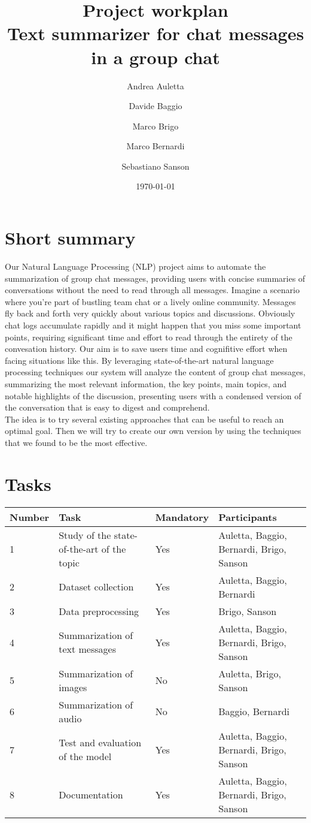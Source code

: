 \documentclass[12pt]{article}
\title{\textbf{Project workplan} \\ 
    \large Text summarizer for chat messages in a group chat}
\author{
    Andrea Auletta
    \and
    Davide Baggio
    \and
    Marco Brigo
    \and
    Marco Bernardi
    \and
    Sebastiano Sanson
}
\date{\today}
\begin{document}
\maketitle
\newpage
\tableofcontents
\newpage


\section{Short summary}
Our Natural Language Processing (NLP) project aims to automate the summarization of group 
chat messages, providing users with concise summaries of conversations without the need to 
read through all messages. Imagine a scenario where you're part of bustling team chat or a 
lively online community. Messages fly back and forth very quickly about various topics and 
discussions. Obviously chat logs accumulate rapidly and it might happen that you miss some 
important points, requiring significant time and effort to read through the entirety of the
convesation history. Our aim is to save users time and cognifitive effort when facing 
situations like this. By leveraging state-of-the-art natural language processing techniques 
our system will analyze the content of group chat messages, summarizing the most relevant 
information, the key points, main topics, and notable highlights of the discussion, 
presenting users with a condensed version of the conversation that is easy to digest and 
comprehend. \\ 
The idea is to try several existing approaches that can be useful to reach an optimal goal. 
Then we will try to create our own version by using the techniques that we found to be the 
most effective.
\section{Tasks}
\begin{center}
    \begin{tabular}{ |p{1.5cm}|p{3cm}|p{2cm}|p{3cm}|} 
        \hline
        Number & Task & Mandatory & Participants \\
        \hline
        1 & Study of the state-of-the-art of the topic & Yes & Auletta, Baggio, Bernardi, Brigo, Sanson\\ 
        \hline
        2 &  Dataset collection & Yes & Auletta, Baggio, Bernardi \\
        \hline
        3 & Data preprocessing & Yes & Brigo, Sanson \\
        \hline
        4 & Summarization of text messages & Yes & Auletta, Baggio, Bernardi, Brigo, Sanson \\
        \hline
        5 & Summarization of images & No & Auletta, Brigo, Sanson \\
        \hline
        6 & Summarization of audio & No & Baggio, Bernardi \\
        \hline
        7 & Test and evaluation of the model & Yes & Auletta, Baggio, Bernardi, Brigo, Sanson \\
        \hline
        8 & Documentation & Yes & Auletta, Baggio, Bernardi, Brigo, Sanson \\
        \hline     
    \end{tabular}
\end{center}
\end{document}
